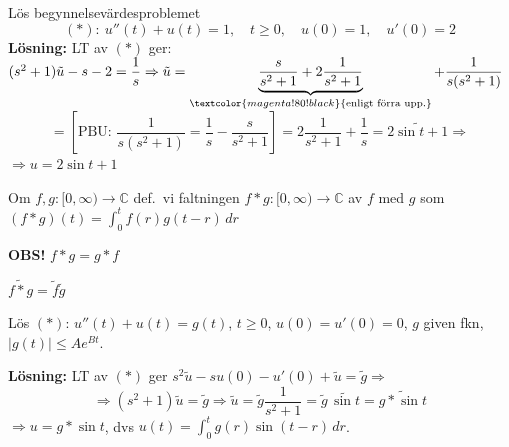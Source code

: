 \begin{example}
Lös begynnelsevärdesproblemet
\[ (*): \ u''(t) + u(t) = 1, \quad t \ge 0, \quad u(0) = 1, \quad u'(0) = 2 \]
\textbf{Lösning:} LT av $(*)$ ger: $(s^2 + 1)\tilde{u} - s - 2 = \dfrac{1}{s} \Rightarrow \tilde{u} = \underbrace{\dfrac{s}{s^2 + 1} + 2\dfrac{1}{s^2 + 1}}_{\textcolor{magenta!80!black}{\text{enligt förra upp.}}} + \dfrac{1}{s(s^2 + 1)}$
\[ = \left[ \text{PBU: } \frac{1}{s(s^2 + 1)} = \frac{1}{s} - \frac{s}{s^2 + 1} \right] = 2\frac{1}{s^2 + 1} + \frac{1}{s} = \widetilde{2\sin t + 1} \Rightarrow \]
$\Rightarrow u = 2\sin t + 1$
\end{example}

\begin{definition}
Om $f, g : [0, \infty) \to \mathbb{C}$ def.\ vi faltningen $f * g : [0, \infty) \to \mathbb{C}$ av $f$ med $g$ som $(f * g)(t) = \displaystyle\int_0^t f(r)g(t - r)\,dr$
\end{definition}

\textcolor{red!70!black}{\textbf{OBS!}} $f * g = g * f$

\begin{theorem}[Proposition 3.4 F]
$\widetilde{f * g} = \tilde{f}\tilde{g}$
\end{theorem}

\begin{example}
Lös $(*)$: $u''(t) + u(t) = g(t)$, $t \ge 0$, $u(0) = u'(0) = 0$, $g$ given fkn, $|g(t)| \le Ae^{Bt}$.

\textbf{Lösning:} LT av $(*)$ ger $s^2\tilde{u} - su(0) - u'(0) + \tilde{u} = \tilde{g} \Rightarrow$
\[ \Rightarrow (s^2 + 1)\tilde{u} = \tilde{g} \Rightarrow \tilde{u} = \tilde{g}\frac{1}{s^2 + 1} = \tilde{g}\,\widetilde{\sin t} = \widetilde{g * \sin t} \]
$\Rightarrow u = g * \sin t$, dvs $u(t) = \displaystyle\int_0^t g(r)\sin(t - r)\,dr$.
\end{example}
